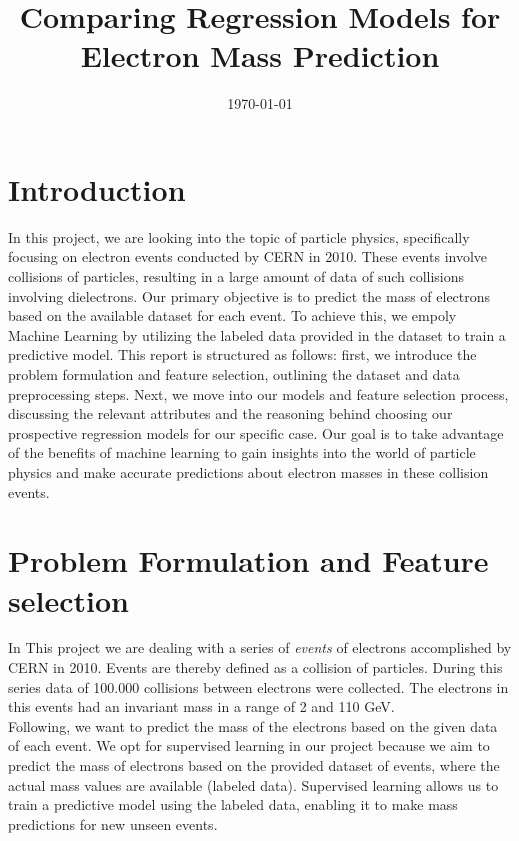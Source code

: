 \documentclass[12pt]{article}
\begin{document}
\setlength{\droptitle}{-4em}

\title{Comparing Regression Models for Electron Mass Prediction\vspace{-2em}}
\date{\today\vspace{-1em}}
\maketitle

\section{Introduction}
In this project, we are looking into the topic of particle physics, specifically focusing on electron events conducted by CERN in 2010. These events involve collisions of particles, resulting in a large amount of data of such collisions involving dielectrons. Our primary objective is to predict the mass of electrons based on the available dataset for each event. To achieve this, we empoly Machine Learning by utilizing the labeled data provided in the dataset to train a predictive model. This report is structured as follows: first, we introduce the problem formulation and feature selection, outlining the dataset and data preprocessing steps. Next, we move into our models and feature selection process, discussing the relevant attributes and the reasoning behind choosing our prospective regression models for our specific case. Our goal is to take advantage of the benefits of machine learning to gain insights into the world of particle physics and make accurate predictions about electron masses in these collision events.


\section{Problem Formulation and Feature selection}


In This project we are dealing with a series of \textit{events} of electrons accomplished by CERN in 2010. 
Events are thereby defined as a collision of particles.
During this series data of 100.000 collisions between electrons were collected. The electrons in this events had an invariant mass in a range of 2 and 110 GeV.\cite{mccauley_dielectron_2016}\\
Following, we want to predict the mass of the electrons based on the given data of each event. We opt for supervised learning in our project because we aim to predict the mass of electrons based on the provided dataset of events, where the actual mass values are available (labeled data). Supervised learning allows us to train a predictive model using the labeled data, enabling it to make mass predictions for new unseen events.
\end{document}
